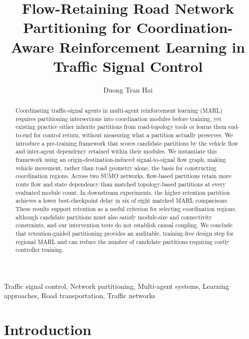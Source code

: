 \documentclass[journal]{IEEEtran}
\title{Flow-Retaining Road Network Partitioning for Coordination-Aware Reinforcement Learning in Traffic Signal Control}
\author{%
Duong Tran Hai
}
\theoremstyle{definition}
\begin{document}
\maketitle

\begin{abstract}
    Coordinating traffic-signal agents in multi-agent reinforcement learning (MARL) requires partitioning intersections into coordination modules before training, yet existing practice either inherits partitions from road-topology tools or learns them end-to-end for control return, without measuring what a partition actually preserves. We introduce a pre-training framework that scores candidate partitions by the vehicle flow and inter-agent dependency retained within their modules. We instantiate this framework using an origin-destination-induced signal-to-signal flow graph, making vehicle movement, rather than road geometry alone, the basis for constructing coordination regions. Across two SUMO networks, flow-based partitions retain more route flow and state dependency than matched topology-based partitions at every evaluated module count. In downstream experiments, the higher-retention partition achieves a lower best-checkpoint delay in six of eight matched MARL comparisons. These results support retention as a useful criterion for selecting coordination regions, although candidate partitions must also satisfy module-size and connectivity constraints, and our intervention tests do not establish causal coupling. We conclude that retention-guided partitioning provides an auditable, training-free design step for regional MARL and can reduce the number of candidate partitions requiring costly controller training.
\end{abstract}

\begin{IEEEkeywords}
    Traffic signal control, Network partitioning, Multi-agent systems,
    Learning approaches,
    Road transportation, Traffic networks
\end{IEEEkeywords}

\section{Introduction}
\label{sec:intro}
\end{document}
